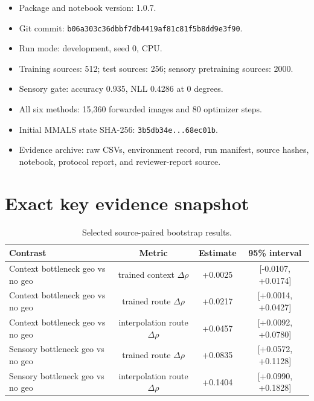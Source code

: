 \documentclass[11pt,a4paper]{article}
\begin{document}
\begin{itemize}
\item Package and notebook version: 1.0.7.
\item Git commit: \texttt{b06a303c36dbbf7db4419af81c81f5b8dd9e3f90}.
\item Run mode: development, seed 0, CPU.
\item Training sources: 512; test sources: 256; sensory pretraining sources: 2000.
\item Sensory gate: accuracy 0.935, NLL 0.4286 at $0$ degrees.
\item All six methods: 15,360 forwarded images and 80 optimizer steps.
\item Initial MMALS state SHA-256: \texttt{3b5db34e...68ec01b}.
\item Evidence archive: raw CSVs, environment record, run manifest, source hashes, notebook, protocol report, and reviewer-report source.
\end{itemize}

\section{Exact key evidence snapshot}

\begin{table}[H]
\centering
\small
\begin{tabularx}{\textwidth}{Yccc}
\toprule
\textbf{Contrast} & \textbf{Metric} & \textbf{Estimate} & \textbf{95\% interval}\\
\midrule
Context bottleneck geo vs no geo & trained context $\Delta\rho$ & +0.0025 & [-0.0107, +0.0174]\\
Context bottleneck geo vs no geo & trained route $\Delta\rho$ & +0.0217 & [+0.0014, +0.0427]\\
Context bottleneck geo vs no geo & interpolation route $\Delta\rho$ & +0.0457 & [+0.0092, +0.0780]\\
Sensory bottleneck geo vs no geo & trained route $\Delta\rho$ & +0.0835 & [+0.0572, +0.1128]\\
Sensory bottleneck geo vs no geo & interpolation route $\Delta\rho$ & +0.1404 & [+0.0990, +0.1828]\\
\bottomrule
\end{tabularx}
\caption{Selected source-paired bootstrap results.}
\end{table}
\end{document}
